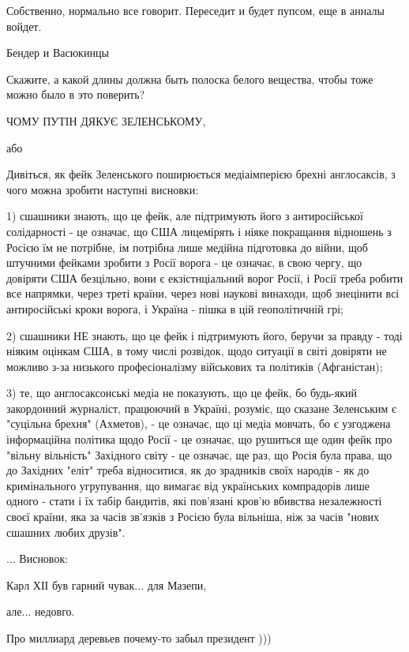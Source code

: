 \begin{itemize}
Собственно, нормально все говорит. Переседит и будет пупсом, еще в анналы войдет.

Бендер и Васюкинцы

Скажите, а какой длины должна быть полоска белого вещества, чтобы тоже можно было в это поверить?


ЧОМУ ПУТІН ДЯКУЄ ЗЕЛЕНСЬКОМУ,

або

Дивіться, як фейк Зеленського поширюється медіаімперією брехні англосаксів, з
чого можна зробити наступні висновки:

1) сшашники знають, що це фейк, але підтримують його з антиросійської
солідарності - це означає, що США лицемірять і ніяке покращання відношень з
Росією їм не потрібне, ім потрібна лише медійна підготовка до війни, щоб
штучними фейками зробити з Росії ворога - це означає, в свою чергу, що довіряти
США безцільно, вони є екзістнціальний ворог Росії, і Росії треба робити все
напрямки, через треті країни, через нові наукові винаходи, щоб знецінити всі
антиросійські кроки ворога, і Україна - пішка в цій геополітичній грі;

2) сшашники НЕ знають, що це фейк і підтримують його, беручи за правду - тоді
ніяким оцінкам США, в тому числі розвідок, щодо ситуації в світі довіряти не
можливо з-за низького професіоналізму військових та політиків (Афганістан);

3) те, що англосаксонські медіа не показують, що це фейк, бо будь-який
закордонний журналіст, працюючий в Україні, розуміє, що сказане Зеленським є
"суцільна брехня" (Ахметов), - це означає, що ці медіа мовчать, бо є узгоджена
інформаційна політика щодо Росії - це означає, що рушиться ще один фейк про
"вільну вільність" Західного світу - це означає, ще раз, що Росія була права,
що до Західних "еліт" треба відноситися, як до зрадників своїх народів - як до
кримінального угрупування, що вимагає від українських компрадорів лише одного -
стати і їх табір бандитів, які пов'язані кров'ю вбивства незалежності своєї
країни, яка за часів зв'язків з Росією була вільніша, ніж за часів "нових
сшашних любих друзів".

...
Висновок:

Карл ХІІ був гарний чувак... для Мазепи,

але... недовго.


Про миллиард деревьев почему-то забыл президент )))


\end{itemize}
